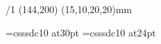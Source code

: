 \chyph  %





\margins/1 (144,200) (15,10,20,20)mm

\typosize[10/15]

\def\pagenumbers{\footline{\hss\tenrm\folio\hss}}


\font\nadpis=csssdc10  at30pt
\font\telo=csssdc10  at24pt